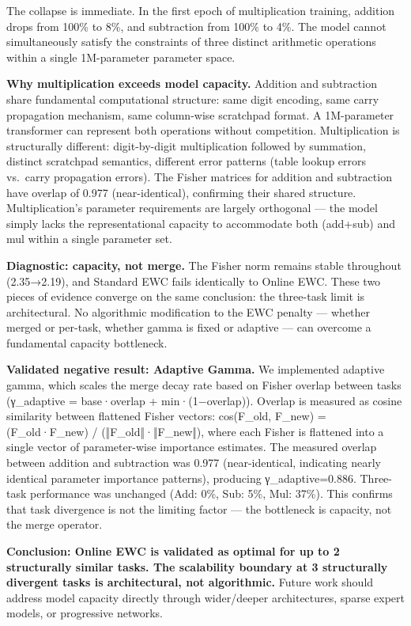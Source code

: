 \documentclass[
]{article}
\begin{document}
The collapse is immediate. In the first epoch of multiplication
training, addition drops from 100\% to 8\%, and subtraction from 100\%
to 4\%. The model cannot simultaneously satisfy the constraints of three
distinct arithmetic operations within a single 1M-parameter parameter
space.

\textbf{Why multiplication exceeds model capacity.} Addition and
subtraction share fundamental computational structure: same digit
encoding, same carry propagation mechanism, same column-wise scratchpad
format. A 1M-parameter transformer can represent both operations without
competition. Multiplication is structurally different: digit-by-digit
multiplication followed by summation, distinct scratchpad semantics,
different error patterns (table lookup errors vs.~carry propagation
errors). The Fisher matrices for addition and subtraction have overlap
of 0.977 (near-identical), confirming their shared structure.
Multiplication's parameter requirements are largely orthogonal --- the
model simply lacks the representational capacity to accommodate both
(add+sub) and mul within a single parameter set.

\textbf{Diagnostic: capacity, not merge.} The Fisher norm remains stable
throughout (2.35→2.19), and Standard EWC fails identically to Online
EWC. These two pieces of evidence converge on the same conclusion: the
three-task limit is architectural. No algorithmic modification to the
EWC penalty --- whether merged or per-task, whether gamma is fixed or
adaptive --- can overcome a fundamental capacity bottleneck.

\textbf{Validated negative result: Adaptive Gamma.} We implemented
adaptive gamma, which scales the merge decay rate based on Fisher
overlap between tasks (γ\_adaptive = base·overlap + min·(1−overlap)).
Overlap is measured as cosine similarity between flattened Fisher
vectors: cos(F\_old, F\_new) = (F\_old·F\_new) / (‖F\_old‖·‖F\_new‖),
where each Fisher is flattened into a single vector of parameter-wise
importance estimates. The measured overlap between addition and
subtraction was 0.977 (near-identical, indicating nearly identical
parameter importance patterns), producing γ\_adaptive=0.886. Three-task
performance was unchanged (Add: 0\%, Sub: 5\%, Mul: 37\%). This confirms
that task divergence is not the limiting factor --- the bottleneck is
capacity, not the merge operator.

\textbf{Conclusion: Online EWC is validated as optimal for up to 2
structurally similar tasks. The scalability boundary at 3 structurally
divergent tasks is architectural, not algorithmic.} Future work should
address model capacity directly through wider/deeper architectures,
sparse expert models, or progressive networks.
\end{document}
